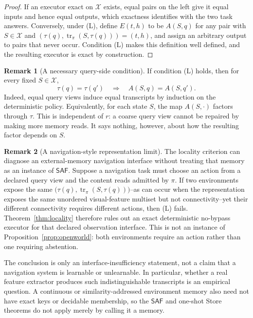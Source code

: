 \documentclass[11pt]{article}
\theoremstyle{definition}
\newtheorem{remark}{Remark}
\theoremstyle{plain}
\newcommand{\SAF}{\mathsf{SAF}}
\begin{document}
\begin{proof}
If an executor exact on \(\mathcal X\) exists, equal pairs on the left give
it equal inputs and hence equal outputs, which exactness identifies with the
two task answers.  Conversely, under (L), define \(E(t,h)\) to be \(A(S,q)\)
for any pair with \(S\in\mathcal X\) and
\((\tau(q),\operatorname{tr}_{\pi}(S,\tau(q)))=(t,h)\), and assign
an arbitrary output to pairs that never occur.  Condition (L) makes this
definition well defined, and the resulting executor is exact by construction.
\end{proof}

\begin{remark}[A necessary query-side condition]
If condition (L) holds, then for every fixed \(S\in\mathcal X\),
\[
 \tau(q)=\tau(q')\quad\Longrightarrow\quad A(S,q)=A(S,q').
\]
Indeed, equal query views induce equal transcripts by induction on the
deterministic policy.  Equivalently, for each state \(S\), the map
\(A(S,\cdot)\) factors through \(\tau\).  This is independent of \(r\): a
coarse query view cannot be repaired by making more memory reads.  It says
nothing, however, about how the resulting factor depends on \(S\).
\end{remark}

\begin{remark}[A navigation-style representation limit]
The locality criterion can diagnose an external-memory navigation interface
without treating that memory as an instance of \(\SAF\).  Suppose a navigation
task must choose an action from a declared query view and the content reads
admitted by \(\pi\).  If two environments expose the same
\(\bigl(\tau(q),\operatorname{tr}_{\pi}(S,\tau(q))\bigr)\)--as can occur
when the representation exposes the same unordered visual-feature multiset
but not connectivity--yet their different connectivity requires different
actions, then (L) fails.  Theorem~\ref{thm:locality} therefore rules out an exact
deterministic no-bypass executor for that declared observation interface.
This is not an instance of Proposition~\ref{prop:openworld}: both
environments require an action rather than one requiring abstention.

The conclusion is only an interface-insufficiency statement, not a claim
that a navigation system is learnable or unlearnable.  In particular, whether
a real feature extractor produces such indistinguishable transcripts is an
empirical question.  A continuous or similarity-addressed environment memory
also need not have exact keys or decidable membership, so the \(\SAF\) and
one-shot Store theorems do not apply merely by calling it a memory.
\end{remark}
\end{document}
